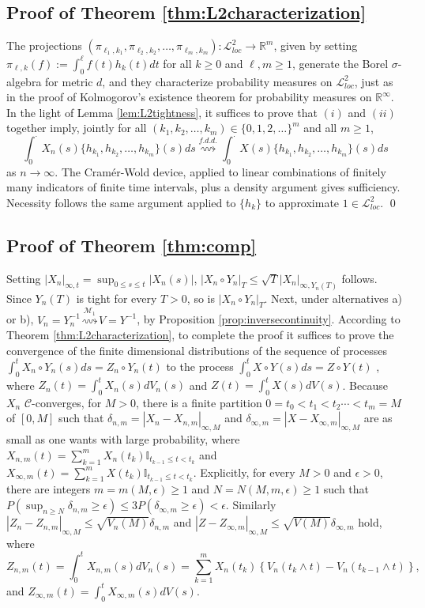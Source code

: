 \documentclass[final]{amsart}
\theoremstyle{definition}
\numberwithin{equation}{section}
\newcommand{\I}{\ensuremath{\mathbb{I}}}
\newcommand{\dR}{\ensuremath{\mathbb{R}}}
\newcommand{\cC}{\ensuremath{\mathcal{C}}}
\newcommand{\cL}{\ensuremath{\mathcal{L}}}
\begin{document}
\subsection{Proof of Theorem \ref{thm:L2characterization}}\label{pf:L2characterization}

The projections $(\pi_{\ell_1,k_1},\pi_{\ell_2,k_2},\ldots,\pi_{\ell_m,k_m}):\cL^2_{loc}\to \dR^m$,
given by setting $\pi_{\ell,k}(f):=\int_0^\ell f(t)h_k(t)dt $ for all $k\ge0$ and $\ell,m\ge1$,
generate the Borel $\sigma$-algebra for metric $d$, and they characterize probability measures on $\cL^2_{loc}$,
just as in the proof of Kolmogorov's existence theorem for probability measures on $\dR^\infty$.
In the light of Lemma \ref{lem:L2tightness}, it suffices to prove that $(i)$ and $(ii)$ together imply,
jointly for all $(k_1,k_2,\ldots,k_m)\in\{0,1,2,\ldots\}^m$ and all $m\ge1$,
$$
\int_0^\cdot X_n(s)\{h_{k_1},h_{k_2},\ldots,h_{k_m}\}(s)ds  \stackrel{f.d.d.}{\rightsquigarrow}
\int_0^\cdot X(s)\{h_{k_1},h_{k_2},\ldots,h_{k_m}\}(s)ds
$$
as $n\to\infty$. The Cram{\'e}r-Wold device, applied to linear combinations of finitely many indicators of finite time intervals,
plus a density argument gives sufficiency. Necessity follows the same argument applied to $\{h_k\}$ to approximate $1\in\cL^2_{loc}$.
\qed

\subsection{Proof of Theorem \ref{thm:comp}}\label{pf:comp}

Setting $|X_n|_{\infty,t} = \sup_{0\le s\le t} |X_n(s)|$, $|X_n\circ Y_n|_T \le \sqrt{T} |X_n|_{\infty,Y_n(T)}$ follows.
Since $Y_n(T)$ is tight for every $T>0$, so is $|X_n\circ Y_n|_T$. Next, under alternatives a) or b),
$V_n = Y_n^{-1} \stackrel{\mathcal{M}_1}{\rightsquigarrow} V = Y^{-1}$, by Proposition \ref{prop:inversecontinuity}.
According to Theorem \ref{thm:L2characterization}, to complete the proof it suffices to prove the convergence of the finite dimensional distributions of the sequence of processes $\int_0^t X_n\circ Y_n(s)ds = Z_n\circ Y_n(t)$ to the process $\int_0^t X\circ Y(s)ds = Z\circ Y(t)$ , where $Z_n(t) = \int_0^t X_n(s) dV_n(s)$ and $Z(t) = \int_0^t X(s) dV(s)$.
Because $X_n$ $\cC$-converges, for $M>0$, there is a finite partition $0=t_0< t_1< t_2 \cdots <t_m=M$ of $[0,M]$ such that
$\delta_{n,m} = |X_n-X_{n,m}|_{\infty,M}$  and $\delta_{\infty,m} = |X-X_{\infty,m}|_{\infty,M}$ are as small as one wants with large probability, where $X_{n,m}(t) = \sum_{k=1}^m X_n(t_k)\I_{t_{k-1}\le t < t_k}$ and $X_{\infty,m}(t) = \sum_{k=1}^m X(t_k)\I_{t_{k-1}\le t < t_k}$.
Explicitly, for every $M>0$ and $\epsilon>0$, there are integers $m=m(M,\epsilon)\ge1$ and $N=N(M,m,\epsilon)\ge1$ such that
$
P(\sup_{n\ge N}\delta_{n,m}\ge\epsilon)\le3P(\delta_{\infty,m}\ge\epsilon)<\epsilon$.
 Similarly $|Z_n-Z_{n,m}|_{\infty,M}\le \sqrt{V_n(M)}\delta_{n,m}$ and
 $|Z-Z_{\infty,m}|_{\infty,M}\le \sqrt{V(M)}\delta_{\infty,m}$ hold, where
$$
Z_{n,m}(t)=\int_0^t X_{n,m}(s) dV_n(s) = \sum_{k=1}^m X_n(t_k)\left\{V_n(t_k\wedge t)-V_n(t_{k-1}\wedge t)\right\},
$$
and $Z_{\infty,m}(t) = \int_0^t X_{\infty,m} (s)dV(s)$.
\end{document}
